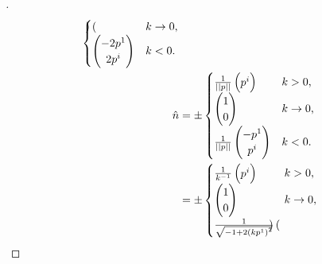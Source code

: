 \documentclass[../main.tex]{subfiles}
\begin{document}
\begin{proof}[]
\begin{align*}
\begin{cases}
\begin{pmatrix}
            \end{pmatrix} & \text{$k\to 0$,} \\
            \begin{pmatrix}
                -2\tensor{p}{^1} \\
                2\tensor{p}{^i} \\
            \end{pmatrix} & \text{$k<0$.} \\
          \end{cases} \\
          \hat{n}
          &= \pm
            \begin{cases}
            \frac{1}{\norm{p}}
             \begin{pmatrix}
                 \tensor{p}{^i} \\
             \end{pmatrix} & \text{$k>0$,} \\
             \begin{pmatrix}
                 1 \\
                 0 \\
             \end{pmatrix} & \text{$k\to 0$,} \\
             \frac{1}{\norm{p}}
             \begin{pmatrix}
                 -\tensor{p}{^1} \\
                 \tensor{p}{^i} \\
             \end{pmatrix} & \text{$k<0$.} \\
           \end{cases} \\
           &= \pm
             \begin{cases}
             \frac{1}{k^{-1}}
              \begin{pmatrix}
                  \tensor{p}{^i} \\
              \end{pmatrix} & \text{$k>0$,} \\
              \begin{pmatrix}
                  1 \\
                  0 \\
              \end{pmatrix} & \text{$k\to 0$,} \\
              \frac{1}{\sqrt{-1+2\left(k\tensor{p}{^1}\right)^2}}
              \begin{pmatrix}

\end{pmatrix}
\end{cases}
\end{align*}
\end{proof}
\end{document}
